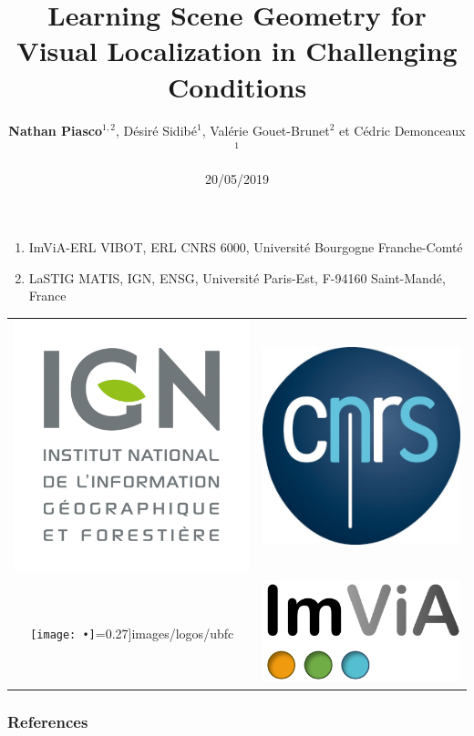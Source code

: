 \documentclass[9pt, aspectratio=169]{beamer}
\title{Learning Scene Geometry for Visual Localization in Challenging Conditions}
\author{\textbf{Nathan Piasco$^{1,2}$}, Désiré Sidibé$^{1}$, Valérie Gouet-Brunet$^{2}$ et Cédric Demonceaux$^{1}$}
\institute{2019 International Conference on Robotics and Automation} %
\date{20/05/2019}
\begin{document}
\begin{frame}[plain,c]
	\titlepage
	\begin{minipage}{0.49\textwidth}
	\centering
		\begin{enumerate}
			\item ImViA-ERL VIBOT, 	ERL CNRS  6000,  Universit\'e  Bourgogne Franche-Comt\'e
			\item LaSTIG MATIS, IGN, ENSG, Universit\'e Paris-Est, 	F-94160 Saint-Mand\'e, France
		\end{enumerate}
	\end{minipage}\hfill
	\begin{minipage}{0.49\textwidth}
	\centering
	\begin{tabular}{c c}
		\includegraphics[width=0.15\linewidth]{images/logos/ign_logo} & 
			\includegraphics[width=0.15\linewidth]{images/logos/cnrs} \\
					\texttt{[image: •]}=0.27\linewidth]{images/logos/ubfc} &
							\includegraphics[width=0.25\linewidth]{images/logos/imvia} \\
	\end{tabular}
	\end{minipage}
\end{frame}





%
%
%

\begin{frame}[plain]
\frametitle{References}

\scriptsize{}

\end{frame}

\appendix
\end{document}
